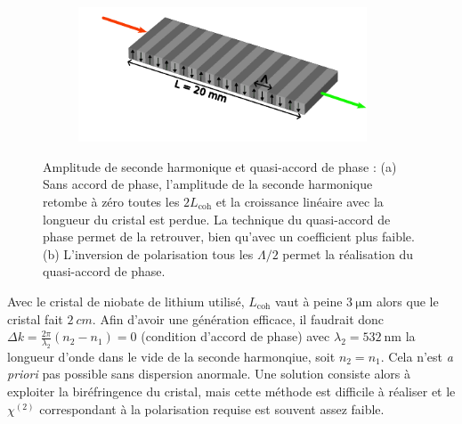 \documentclass[11pt,a4paper] { article}
\newcommand{\lmbd}[1]{$\SI{#1}{\nano\metre}$}
\newcommand{\mathsc}[1]{\mathrm{\scriptscriptstyle {#1}}}
\begin{document}
\begin{figure}[htpb] 
\centering
\begin{subfigure}[b]{0.48\textwidth}
	\centering
	\hspace*{-0.8cm}
	
	\vspace*{-1cm}
	\caption{}
	\label{fig:agen}
\end{subfigure}
\begin{subfigure}[b]{0.48\textwidth}
	\includegraphics[height=4cm]{./img/PP.pdf}
	\vspace*{0.8cm}
	\caption{}
	\label{fig:inversion}
\end{subfigure}
\hspace*{-0.6cm}
\caption{Amplitude de seconde harmonique et quasi-accord de phase : (a) \small  Sans accord de phase, l'amplitude de la seconde harmonique retombe à zéro toutes les $2L_\mathsc{coh}$ et la croissance linéaire avec la longueur du cristal est perdue. La technique du quasi-accord de phase permet de la retrouver, bien qu'avec un coefficient plus faible. (b) L'inversion de polarisation tous les $\Lambda/2$ permet la réalisation du quasi-accord de phase.} %
\label{fig:QPM}
\end{figure}

Avec le cristal de niobate de lithium utilisé, $L_\mathsc{coh}$ vaut à peine $\SI{3}{\micro\meter}$ alors que le cristal fait $\SI{2}{cm}$.
Afin d'avoir une génération efficace, il faudrait donc $\Delta k = \frac{2\pi}{\lambda_2}(n_2-n_1) = 0$ (condition d'accord de phase) avec $\lambda_2=$\lmbd{532} la longueur d'onde dans le vide de la seconde harmonqiue, soit $n_2 = n_1$. Cela n'est \textit{a priori} pas possible sans dispersion anormale. Une solution consiste alors à exploiter la biréfringence du cristal, mais cette méthode est difficile à réaliser et le $\chi^{(2)}$ correspondant à la polarisation requise est souvent assez faible. 
\end{document}
